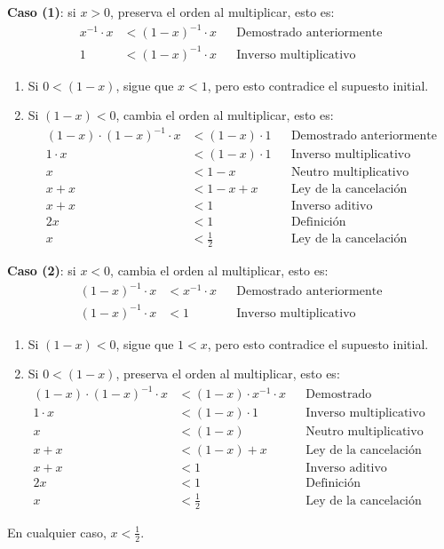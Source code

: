 \documentclass[11pt]{article}
\begin{document}
\begin{enumerate}
\begin{enumerate}[label=(\alph*)]
 \textbf{ Caso (1)}: si $x>0$, preserva el orden al multiplicar, esto es:\begin{align*}
   x^{-1} \cdot x &<(1-x)^{-1} \cdot x && \text{Demostrado anteriormente}\\
   1 &<(1-x)^{-1} \cdot x && \text{Inverso multiplicativo}
  \end{align*}
  \begin{enumerate}[label=\roman*)]
   \item Si $0<(1-x)$, sigue que $x<1$, pero esto contradice el supuesto initial.
   
 \pagebreak
 
   \item Si $(1-x)<0$, cambia el orden al multiplicar, esto es: \begin{align*}
    (1-x)\cdot (1-x)^{-1} \cdot x &< (1-x)\cdot1  && \text{Demostrado anteriormente}\\
    1 \cdot x &< (1-x)\cdot1  && \text{Inverso multiplicativo}\\
   x &< 1-x  && \text{Neutro multiplicativo}\\
   x +x&< 1-x +x && \text{Ley de la cancelación}\\
   x +x&< 1 && \text{Inverso aditivo}\\
   2x&< 1 && \text{Definición}\\
   x&< \frac{1}{2} && \text{Ley de la cancelación}
   \end{align*}
  \end{enumerate}

  \textbf{Caso (2)}: si $x<0$, cambia el orden al multiplicar, esto es: \begin{align*}
   (1-x)^{-1} \cdot x &< x^{-1} \cdot x && \text{Demostrado anteriormente}\\
   (1-x)^{-1} \cdot x &< 1 && \text{Inverso multiplicativo}
  \end{align*}
  \begin{enumerate}[label=\roman*)]
   \item Si $(1-x)<0$, sigue que $1<x$, pero esto contradice el supuesto initial.
   \item Si $0<(1-x)$, preserva el orden al multiplicar, esto es: \begin{align*}
   (1-x)\cdot (1-x)^{-1}\cdot x &< (1-x)\cdot x^{-1} \cdot x && \text{Demostrado anteriormente}\\
   1\cdot x &< (1-x)\cdot 1 && \text{Inverso multiplicativo}\\
   x &< (1-x) && \text{Neutro multiplicativo}\\
   x+x &< (1-x) +x&& \text{Ley de la cancelación}\\
   x+x &< 1&& \text{Inverso aditivo}\\
   2x &< 1&& \text{Definición}\\
   x &< \frac{1}{2} && \text{Ley de la cancelación}
   \end{align*}
  \end{enumerate}
  En cualquier caso, $x<\frac{1}{2}$.


\end{enumerate}
\end{enumerate}
\end{document}
